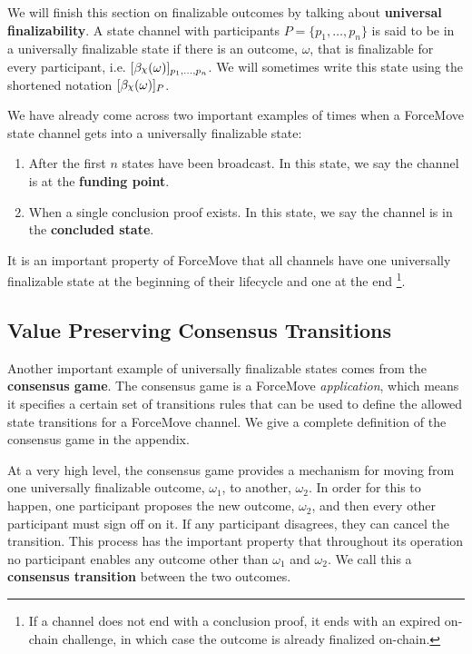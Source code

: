 \documentclass{article}
\DeclareRobustCommand{\rchi}{{\mathpalette\irchi\relax}}
\newcommand{\irchi}[2]{\raisebox{\depth}{$#1\chi$}} %
\theoremstyle{definition}
\newcommand{\enf}[1]{[#1]}
\begin{document}
We will finish this section on finalizable outcomes by talking about \textbf{universal finalizability}.
A state channel with participants $P = \{p_1, \dots, p_n\}$ is said to be in a universally finalizable
state if there is an outcome, $\omega$, that is finalizable for every participant, i.e.
$\enf{\beta_\rchi(\omega)}_{p_1,\dots, p_n}$.
We will sometimes write this state using the shortened notation $\enf{\beta_\rchi(\omega)}_P$.

We have already come across two important examples of times when a ForceMove state channel
gets into a universally finalizable state:
\begin{enumerate}
  \item After the first $n$ states have been broadcast. In this state, we say the channel is at the \textbf{funding point}.
  \item When a single conclusion proof exists. In this state, we say the channel is in the \textbf{concluded state}.
\end{enumerate}
It is an important property of ForceMove that all channels have one universally finalizable
state at the beginning of their lifecycle and one at the end
\footnote{If a channel does not end with a conclusion proof, it ends with an expired on-chain challenge,
in which case the outcome is already finalized on-chain.}.

\subsection{Value Preserving Consensus Transitions}

Another important example of universally finalizable states comes from the \textbf{consensus game}.
The consensus game is a ForceMove \textit{application}, which means it specifies a certain
set of transitions rules that can be used to define the allowed state transitions for a ForceMove
channel.
We give a complete definition of the consensus game in the appendix.

At a very high level, the consensus game provides a mechanism for moving from one universally
finalizable outcome, $\omega_1$, to another, $\omega_2$. 
In order for this to happen, one participant proposes the new outcome, $\omega_2$, and then
every other participant must sign off on it. 
If any participant disagrees, they can cancel the transition.
This process has the important property that throughout its operation no participant enables
any outcome other than $\omega_1$ and $\omega_2$.
We call this a \textbf{consensus transition} between the two outcomes.
\end{document}
